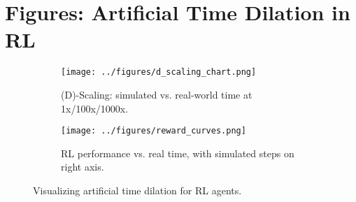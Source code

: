 \documentclass{standalone}
\begin{document}
\section*{Figures: Artificial Time Dilation in RL}

\begin{figure}[h]
\centering
\begin{subfigure}{0.48\textwidth}
    \texttt{[image: ../figures/d\_scaling\_chart.png]}
    \caption{(D)-Scaling: simulated vs. real-world time at 1x/100x/1000x.}
    \label{fig:d_scaling}
\end{subfigure}\hfill
\begin{subfigure}{0.48\textwidth}
    \texttt{[image: ../figures/reward\_curves.png]}
    \caption{RL performance vs. real time, with simulated steps on right axis.}
    \label{fig:reward_curves}
\end{subfigure}
\caption{Visualizing artificial time dilation for RL agents.}
\label{fig:time_dilation}
\end{figure}
\end{document}
